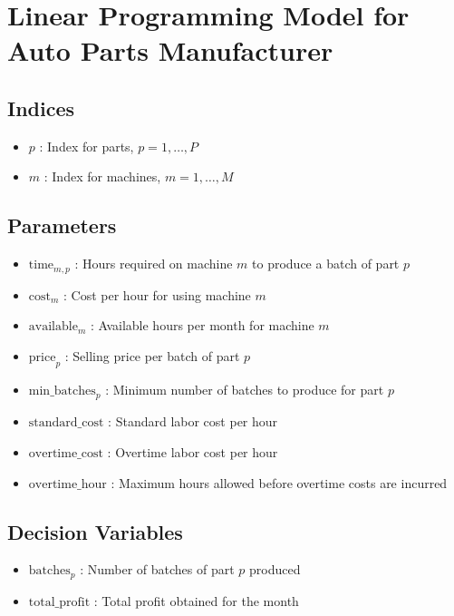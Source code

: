 \documentclass{article}
\begin{document}
\section*{Linear Programming Model for Auto Parts Manufacturer}

\subsection*{Indices}
\begin{itemize}
    \item \( p \) : Index for parts, \( p = 1, \ldots, P \)
    \item \( m \) : Index for machines, \( m = 1, \ldots, M \)
\end{itemize}

\subsection*{Parameters}
\begin{itemize}
    \item \( \text{time}_{m,p} \) : Hours required on machine \( m \) to produce a batch of part \( p \)
    \item \( \text{cost}_{m} \) : Cost per hour for using machine \( m \)
    \item \( \text{available}_{m} \) : Available hours per month for machine \( m \)
    \item \( \text{price}_{p} \) : Selling price per batch of part \( p \)
    \item \( \text{min\_batches}_{p} \) : Minimum number of batches to produce for part \( p \)
    \item \( \text{standard\_cost} \) : Standard labor cost per hour
    \item \( \text{overtime\_cost} \) : Overtime labor cost per hour
    \item \( \text{overtime\_hour} \) : Maximum hours allowed before overtime costs are incurred
\end{itemize}

\subsection*{Decision Variables}
\begin{itemize}
    \item \( \text{batches}_{p} \) : Number of batches of part \( p \) produced
    \item \( \text{total\_profit} \) : Total profit obtained for the month
\end{itemize}
\end{document}
